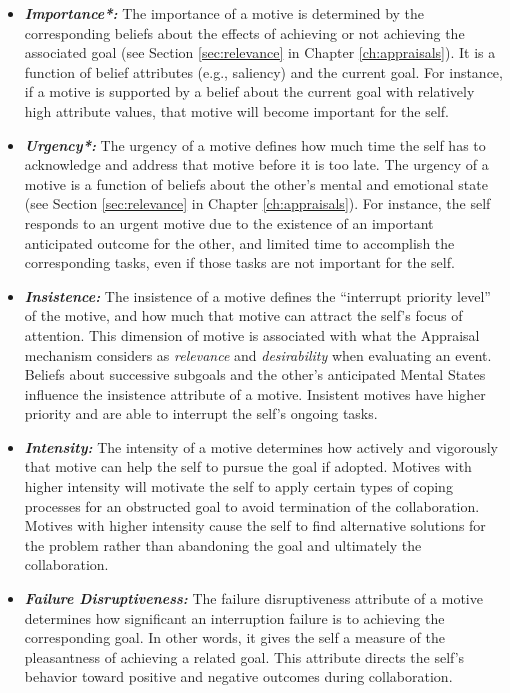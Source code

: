 \documentclass[12pt]{report}
\begin{document}
\begin{itemize}
  \item \textbf{\textit{Importance*:}} The importance of a motive is determined
  by the corresponding beliefs about the effects of achieving or not achieving
  the associated goal (see Section \ref{sec:relevance} in Chapter
  \ref{ch:appraisals}). It is a function of belief attributes (e.g., saliency)
  and the current goal. For instance, if a motive is supported by a belief about
  the current goal with relatively high attribute values, that motive will
  become important for the self.
  
  \item \textbf{\textit{Urgency*:}} The urgency of a motive defines how much
  time the self has to acknowledge and address that motive before it is too
  late. The urgency of a motive is a function of beliefs about the other's
  mental and emotional state (see Section \ref{sec:relevance} in Chapter
  \ref{ch:appraisals}). For instance, the self responds to an urgent motive due
  to the existence of an important anticipated outcome for the other, and
  limited time to accomplish the corresponding tasks, even if those tasks are
  not important for the self.
  
  \item \textbf{\textit{Insistence:}} The insistence of a motive defines the
  ``interrupt priority level'' of the motive, and how much that motive can
  attract the self's focus of attention. This dimension of motive is associated
  with what the Appraisal mechanism considers as \emph{relevance} and
  \emph{desirability} when evaluating an event. Beliefs about successive
  subgoals and the other's anticipated Mental States influence the insistence
  attribute of a motive. Insistent motives have higher priority and are able to
  interrupt the self's ongoing tasks.
  
  \item \textbf{\textit{Intensity:}} The intensity of a motive determines how
  actively and vigorously that motive can help the self to pursue the goal if
  adopted. Motives with higher intensity will motivate the self to apply
  certain types of coping processes for an obstructed goal to avoid termination
  of the collaboration. Motives with higher intensity cause the self to find
  alternative solutions for the problem rather than abandoning the goal and
  ultimately the collaboration.
  
  \item \textbf{\textit{Failure Disruptiveness:}} The failure disruptiveness
  attribute of a motive determines how significant an interruption failure is to
  achieving the corresponding goal. In other words, it gives the self a measure
  of the pleasantness of achieving a related goal. This attribute directs the
  self's behavior toward positive and negative outcomes during collaboration.
\end{itemize}
\end{document}

